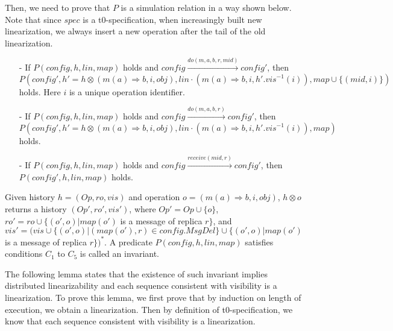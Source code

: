 Then, we need to prove that $P$ is a simulation relation in a way shown below. Note that since $\mathit{spec}$ is a t0-specification, when increasingly built new linearization, we always insert a new operation after the tail of the old linearization. 

\begin{itemize}
\setlength{\itemsep}{0.5pt}
\item[-] If $P(\mathit{config},h,\mathit{lin},\mathit{map})$ holds and $\mathit{config} {\xrightarrow{\mathit{do}(m,a,b,r,\mathit{mid})}} \mathit{config}'$, then $P(\mathit{config}', h' = h \otimes (m(a) \Rightarrow b,i,\mathit{obj}), \mathit{lin} \cdot (m(a) \Rightarrow b,i,h'.\mathit{vis}^{-1}(i)),\mathit{map} \cup \{ (\mathit{mid}, i) \})$ holds. Here $i$ is a unique operation identifier.

\item[-] If $P(\mathit{config},h,\mathit{lin},\mathit{map})$ holds and $\mathit{config} {\xrightarrow{\mathit{do}(m,a,b,r)}} \mathit{config}'$, then $P(\mathit{config}',h' = h \otimes (m(a) \Rightarrow b,i,\mathit{obj}), \mathit{lin} \cdot (m(a) \Rightarrow b,i,h'.\mathit{vis}^{-1}(i)),\mathit{map})$ holds.

\item[-] If $P(\mathit{config},h,\mathit{lin},\mathit{map})$ holds and $\mathit{config} {\xrightarrow{\mathit{receive}(\mathit{mid},r)}} \mathit{config}'$, then $P(\mathit{config}',h,\mathit{lin},\mathit{map})$ holds.
\end{itemize}

Given history $h = (\mathit{Op},\mathit{ro},\mathit{vis})$ and operation $o = (m(a) \Rightarrow b,i,\mathit{obj})$, $h \otimes o$ returns a history $(\mathit{Op}',\mathit{ro}',\mathit{vis}')$, where $\mathit{Op}' = \mathit{Op} \cup \{ o \}$, $\mathit{ro}' = \mathit{ro} \cup \{ (o',o) \vert \mathit{map}(o')$ is a message of replica $r \}$, and $\mathit{vis}' = (\mathit{vis} \cup \{ (o',o) \vert (\mathit{map}(o'),r) \in \mathit{config}.\mathit{MsgDel} \} \cup \{ (o',o) \vert \mathit{map}(o')$ is a message of replica $r \})^*$. A predicate $P(\mathit{config},h,\mathit{lin},\mathit{map})$ satisfies conditions $C_1$ to $C_5$ is called an invariant. 

The following lemma states that the existence of such invariant implies distributed linearizability and each sequence consistent with visibility is a linearization. To prove this lemma, we first prove that by induction on length of execution, we obtain a linearization. Then by definition of t0-specification, we know that each sequence consistent with visibility is a linearization. 

